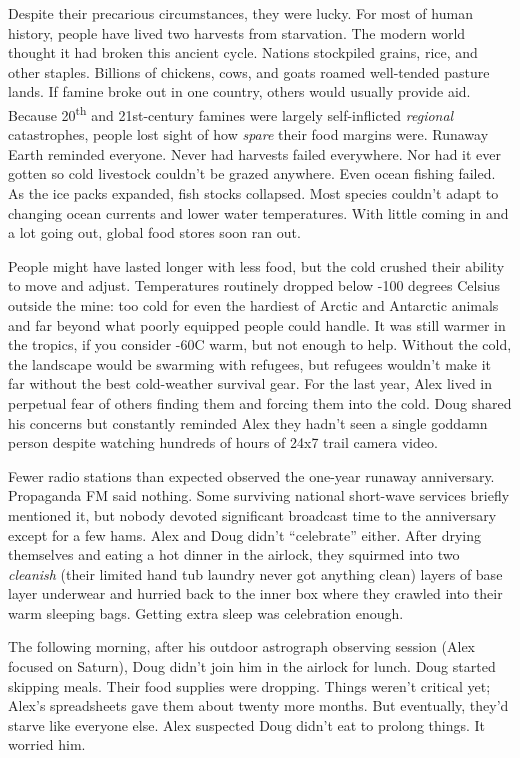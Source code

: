 Despite their precarious circumstances, they were lucky. For most of
human history, people have lived two harvests from starvation. The
modern world thought it had broken this ancient cycle. Nations
stockpiled grains, rice, and other staples. Billions of chickens, cows,
and goats roamed well-tended pasture lands. If famine broke out in one
country, others would usually provide aid. Because
20\textsuperscript{th} and 21st-century famines were largely
self-inflicted \emph{regional} catastrophes, people lost sight of how
\emph{spare} their food margins were. Runaway Earth reminded everyone.
Never had harvests failed everywhere. Nor had it ever gotten so cold
livestock couldn't be grazed anywhere. Even ocean fishing failed. As the
ice packs expanded, fish stocks collapsed. Most species couldn't adapt
to changing ocean currents and lower water temperatures. With little
coming in and a lot going out, global food stores soon ran out.

People might have lasted longer with less food, but the cold crushed
their ability to move and adjust. Temperatures routinely dropped below
-100 degrees Celsius outside the mine: too cold for even the hardiest of
Arctic and Antarctic animals and far beyond what poorly equipped people
could handle. It was still warmer in the tropics, if you consider -60C
warm, but not enough to help. Without the cold, the landscape would be
swarming with refugees, but refugees wouldn't make it far without the
best cold-weather survival gear. For the last year, Alex lived in
perpetual fear of others finding them and forcing them into the cold.
Doug shared his concerns but constantly reminded Alex they hadn't seen a
single goddamn person despite watching hundreds of hours of 24x7 trail
camera video.

Fewer radio stations than expected observed the one-year runaway
anniversary. Propaganda FM said nothing. Some surviving national
short-wave services briefly mentioned it, but nobody devoted significant
broadcast time to the anniversary except for a few hams. Alex and Doug
didn't ``celebrate'' either. After drying themselves and eating a hot
dinner in the airlock, they squirmed into two \emph{cleanish} (their
limited hand tub laundry never got anything clean) layers of base layer
underwear and hurried back to the inner box where they crawled into
their warm sleeping bags. Getting extra sleep was celebration enough.

The following morning, after his outdoor astrograph observing session
(Alex focused on Saturn), Doug didn't join him in the airlock for lunch.
Doug started skipping meals. Their food supplies were dropping. Things
weren't critical yet; Alex's spreadsheets gave them about twenty more
months. But eventually, they'd starve like everyone else. Alex suspected
Doug didn't eat to prolong things. It worried him.

